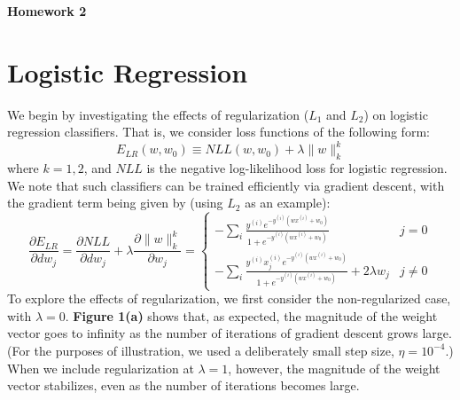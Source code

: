 \documentclass[10pt,psamsfonts]{amsart}
\theoremstyle{definition}
\theoremstyle{remark}
\numberwithin{equation}{section}
\begin{document}
	

\begin{center}
	{\bf Homework 2}
\end{center}

\section{Logistic Regression}

We begin by investigating the effects of regularization ($L_1$ and $L_2$) on logistic regression classifiers. That is, we consider loss functions of the following form:
$$E_{LR}(w, w_0) \equiv NLL(w, w_0) + \lambda\|w\|_k^k$$
where $k = 1, 2$, and $NLL$ is the negative log-likelihood loss for logistic regression. We note that such classifiers can be trained efficiently via gradient descent, with the gradient term being given by (using $L_2$ as an example):
$$\frac{\partial E_{LR}}{\partial dw_j} = \frac{\partial NLL}{\partial dw_j} + \lambda \frac{\partial \|w\|_k^k}{\partial w_j} = \left\{ \begin{matrix} -\sum_i \frac{y^{(i)} e^{-y^{(i)}(wx^{(i)} + w_0)}}{1 + e^{-y^{(i)}(wx^{(i)} + w_0)}} & j =0 \\ -\sum_i \frac{y^{(i)} x^{(i)}_j e^{-y^{(i)}(wx^{(i)} + w_0)}}{1 + e^{-y^{(i)}(wx^{(i)} + w_0)}} + 2\lambda w_j & j \neq 0 \end{matrix}  \right.$$
To explore the effects of regularization, we first consider the non-regularized case, with $\lambda = 0$. {\bf Figure 1(a)} shows that, as expected, the magnitude of the weight vector goes to infinity as the number of iterations of gradient descent grows large. (For the purposes of illustration, we used a deliberately small step size, $\eta = 10^{-4}$.) When we include regularization at $\lambda = 1$, however, the magnitude of the weight vector stabilizes, even as the number of iterations becomes large.
\end{document}
